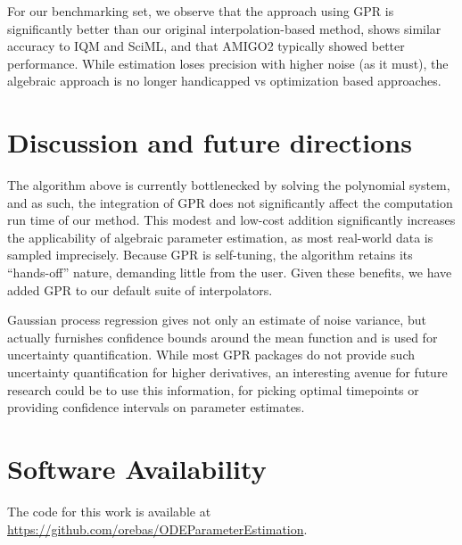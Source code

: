\documentclass{ifacconf}
\begin{document}
    
    


    For our benchmarking set, we observe that the approach using GPR is significantly better than our original interpolation-based method, shows similar accuracy to IQM and SciML, and that AMIGO2 typically showed better performance. While estimation loses precision with higher noise (as it must), the algebraic approach is no longer handicapped vs optimization based approaches.

	\section{Discussion and future directions}
	The algorithm above is currently bottlenecked by solving the polynomial system, and as such, the integration of GPR does not significantly affect the computation run time of our method.  This modest and low-cost addition significantly increases the applicability of algebraic parameter estimation, as most real-world data is sampled imprecisely.  Because GPR is self-tuning, the algorithm retains its ``hands-off'' nature, demanding little from the user.  Given these benefits, we have added GPR to our default suite of interpolators.
	 
	Gaussian process regression gives not only an estimate of noise variance, but actually furnishes confidence bounds around the mean function and is used for uncertainty quantification.  While most GPR packages do not provide such uncertainty quantification for higher derivatives, an interesting avenue for future research could be to use this information, for picking optimal timepoints or providing confidence intervals on parameter estimates.

    \section*{Software Availability}
The code for this work is available at \url{https://github.com/orebas/ODEParameterEstimation}.

	
	
	
\end{document}
